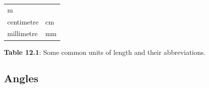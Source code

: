 {\begin{center}
\begin{xtabular*}{\mytablewidth}[t]{|p{10\mystarwidth}|p{10\mystarwidth}|}
    
        m%
     \tabularnewline{}
    
    
        centimetre &
    
    
        cm%
     \tabularnewline{}
    
    
        millimetre &
    
    
        mm%
     \tabularnewline{}
    \end{xtabular*}
      \end{center}
    \begin{center}{\small\bfseries Table 12.1}: Some common units of length and their abbreviations.\end{center}
    
    \addtocounter{footnote}{-0}
    
        }%
      
    \par
  
    
    \label{m39370*cid4}
            \subsection{ Angles}
            \nopagebreak
            
